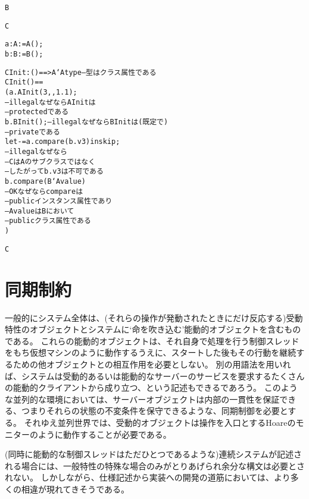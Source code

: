 \documentclass[\pformat,12pt]{jarticle}
\begin{document}
\begin{description}
\begin{alltt}
 B

 C

    a: A :=  A();
    b: B :=  B();



    CInit: () ==> A`Atype   --型はクラス属性である
    CInit() ==
      (a.AInit(3,,1.1);  
                            --illegal なぜなら AInit は
                            -- protectedである
       b.BInit();           --illegal なぜなら BInit は(既定で)
                            -- privateである
       let - = a.compare(b.v3) in skip;
                            --illegal なぜなら
                            -- CはAのサブクラスではなく
                            -- したがって b.v3 は不可である
        b.compare(B`Avalue)
                            --OK なぜならcompare は
                            -- publicインスタンス属性であり
                            -- Avalue は Bにおいて
                            -- publicクラス属性である
      )

 C
\end{alltt}
  


\end{description}

\section{同期制約}\label{ch:sync}

一般的にシステム全体は、(それらの操作が発動されたときにだけ反応する)受動特性のオブジェクトとシステムに`命を吹き込む'能動的オブジェクトを含むものである。
これらの能動的オブジェクトは、それ自身で処理を行う制御スレッドをもち仮想マシンのように動作するうえに、スタートした後もその行動を継続するための他オブジェクトとの相互作用を必要としない。
別の用語法を用いれば、システムは受動的あるいは能動的なサーバーのサービスを要求するたくさんの能動的クライアントから成り立つ、という記述もできるであろう。
このような並列的な環境においては、サーバーオブジェクトは内部の一貫性を保証できる、つまりそれらの状態の不変条件を保守できるような、同期制御を必要とする。
それゆえ並列世界では、受動的オブジェクトは操作を入口とするHoareのモニターのように動作することが必要である。

(同時に能動的な制御スレッドはただひとつであるような)連続システムが記述される場合には、一般特性の特殊な場合のみがとりあげられ余分な構文は必要とされない。
しかしながら、仕様記述から実装への開発の道筋においては、より多くの相違が現れてきそうである。
\end{document}
